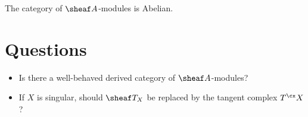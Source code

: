 \documentclass[english,no-theorem-numbers]{short-notes}
\begin{document}
\begin{Prop}
    The category of $\sheaf A$-modules is Abelian.
\end{Prop}

\section*{Questions}

\begin{itemize}
    \item Is there a well-behaved derived category of $\sheaf A$-modules?
    \item If $X$ is singular, should $\sheaf T_X$ be replaced by the tangent complex $T^\cx X$?
\end{itemize}

\end{document}
